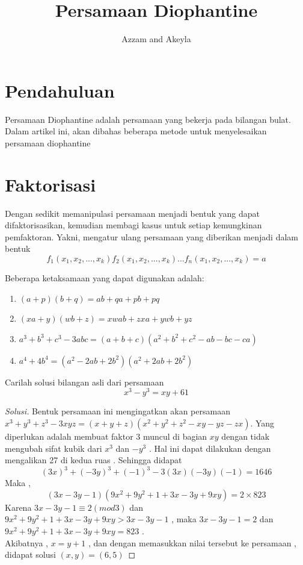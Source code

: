 \documentclass[11pt]{scrartcl}
\title{Persamaan Diophantine}
\author{Azzam and Akeyla}
\begin{document}
\maketitle

\renewcommand*\contentsname{Daftar Isi}
\tableofcontents

\newpage

\section{Pendahuluan}
Persamaan Diophantine adalah persamaan yang bekerja pada bilangan bulat. Dalam artikel ini, akan dibahas beberapa metode untuk menyelesaikan persamaan diophantine
\section{Faktorisasi}
Dengan sedikit memanipulasi persamaan menjadi bentuk yang dapat difaktorisasikan, kemudian membagi kasus untuk setiap kemungkinan pemfaktoran. Yakni, mengatur ulang persamaan yang diberikan menjadi dalam bentuk \[f_1(x_1,x_2,...,x_k)f_2(x_1,x_2,...,x_k)...f_n(x_1,x_2,...,x_k) = a\] 

Beberapa ketaksamaan yang dapat digunakan adalah:
\begin{enumerate}
    \item $(a + p)(b + q) = ab + qa + pb + pq$
    \item $(xa + y)(wb + z) = xwab + zxa + ywb + yz$
    \item $a^3 + b^3 + c^3 - 3abc = (a + b + c)(a^2 + b^2 + c^2 - ab - bc - ca)$
    \item $a^4 + 4b^4 = (a^2 - 2ab + 2b^2)(a^2 + 2ab + 2b^2)$
\end{enumerate}

\begin{example}
    Carilah solusi bilangan asli dari persamaan $$x^3-y^3=xy+61$$
\end{example}

\begin{proof}[Solusi]
    Bentuk persamaan ini mengingatkan akan persamaan $x^3+y^3+z^3-3xyz=(x+y+z)(x^2+y^2+z^2-xy-yz-zx)$. Yang diperlukan adalah membuat faktor 3 muncul di bagian $xy$ dengan tidak mengubah sifat kubik dari $x^3$ dan $-y^3$ . Hal ini dapat dilakukan dengan mengalikan 27 di kedua ruas . Sehingga didapat $$(3x)^3+(-3y)^3+(-1)^3-3(3x)(-3y)(-1)=1646$$
    Maka , $$(3x-3y-1)(9x^2+9y^2+1+3x-3y+9xy)=2\times823$$
    Karena $3x-3y-1\equiv 2(mod 3)$ dan $9x^2+9y^2+1+3x-3y+9xy>3x-3y-1$ , maka $3x-3y-1=2$ dan $9x^2+9y^2+1+3x-3y+9xy=823$ . \\
    Akibatnya , $x=y+1$ , dan dengan memasukkan nilai tersebut ke persamaan , didapat solusi $(x,y)=(6,5)$
\end{proof}
\end{document}
